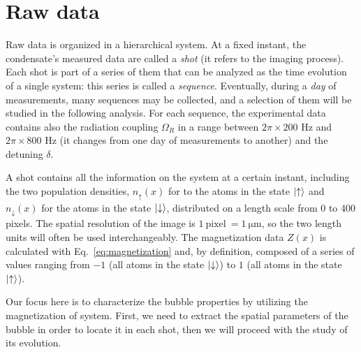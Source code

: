 
\section{Raw data}
Raw data is organized in a hierarchical system. At a fixed instant, the condensate's measured data are called a \textit{shot} (it refers to the imaging process). Each shot is part of a series of them that can be analyzed as the time evolution of a single system: this series is called a \textit{sequence}. Eventually, during a \textit{day} of measurements, many sequences may be collected, and a selection of them will be studied in the following analysis. For each sequence, the experimental data contains also the radiation coupling $\Omega_R$ in a range between $2\pi \times 200$ \unit{\hertz} and $2\pi \times 800$ \unit{\hertz} (it changes from one day of measurements to another) and the detuning $\delta$.

A shot contains all the information on the system at a certain instant, including the two population densities, $n_\uparrow(x)$ for to the atoms in the state $\ket{\uparrow}$ and $n_\downarrow(x)$ for the atoms in the state $\ket{\downarrow}$, distributed on a length scale from 0 to 400 pixels. The spatial resolution of the image is $1\ \text{pixel}\ = 1\ \unit{\micro\meter}$, so the two length units will often be used interchangeably. The magnetization data $Z(x)$ is calculated with Eq.\ \eqref{eq:magnetization} and, by definition, composed of a series of values ranging from $-1$ (all atoms in the state $\ket{\downarrow}$) to $1$ (all atoms in the state $\ket{\uparrow}$).

Our focus here is to characterize the bubble properties by utilizing the magnetization of system. First, we need to extract the spatial parameters of the bubble in order to locate it in each shot, then we will proceed with the study of its evolution.

